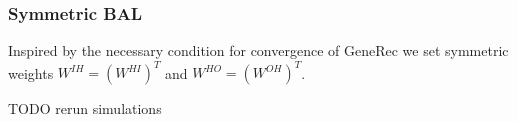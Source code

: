 
\subsubsection{Symmetric BAL}
\label{sec:our-bal-sym} 

Inspired by the necessary condition for convergence of GeneRec \citep{o1996bio} we set symmetric weights $W^{IH} = (W^{HI})^T$ and $W^{HO} = (W^{OH})^T$. 

TODO rerun simulations 

